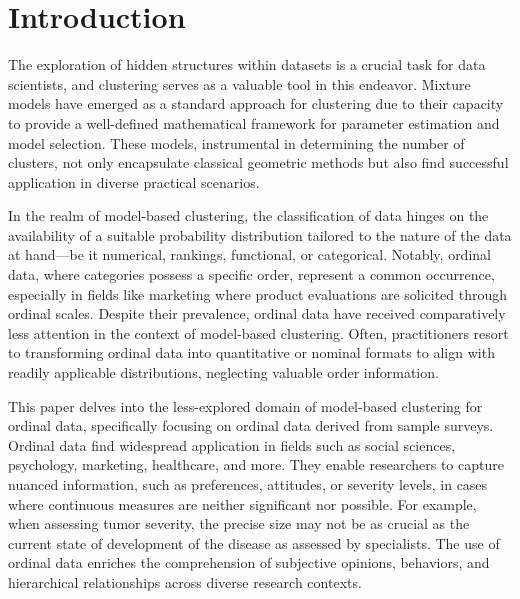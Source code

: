 
\section{Introduction}
The exploration of hidden structures within datasets is a crucial task for data scientists, and clustering serves as a valuable tool in this endeavor. Mixture models have emerged as a standard approach for clustering due to their capacity to provide a well-defined mathematical framework for parameter estimation and model selection. These models, instrumental in determining the number of clusters, not only encapsulate classical geometric methods but also find successful application in diverse practical scenarios.

In the realm of model-based clustering, the classification of data hinges on the availability of a suitable probability distribution tailored to the nature of the data at hand—be it numerical, rankings, functional, or categorical. Notably, ordinal data, where categories possess a specific order, represent a common occurrence, especially in fields like marketing where product evaluations are solicited through ordinal scales. Despite their prevalence, ordinal data have received comparatively less attention in the context of model-based clustering. Often, practitioners resort to transforming ordinal data into quantitative or nominal formats to align with readily applicable distributions, neglecting valuable order information.

This paper delves into the less-explored domain of model-based clustering for ordinal data, specifically focusing on ordinal data derived from sample surveys. Ordinal data find widespread application in fields such as social sciences, psychology, marketing, healthcare, and more. They enable researchers to capture nuanced information, such as preferences, attitudes, or severity levels, in cases where continuous measures are neither significant nor possible. For example, when assessing tumor severity, the precise size may not be as crucial as the current state of development of the disease as assessed by specialists. The use of ordinal data enriches the comprehension of subjective opinions, behaviors, and hierarchical relationships across diverse research contexts.

